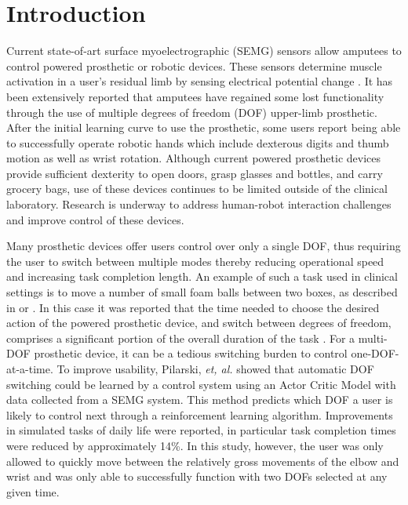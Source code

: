 \documentclass[twocolumn]{sagej}
\begin{document}

\maketitle

\section*{Introduction}

Current state-of-art surface myoelectrographic (SEMG) sensors allow amputees to control powered prosthetic or robotic devices.  These sensors determine muscle activation  in a user's residual limb by sensing electrical potential change \cite{Hargrove2007c}.  It has been extensively reported that amputees have regained some lost functionality through the use of  multiple degrees of freedom (DOF) upper-limb prosthetic\cite{Dalley02013}.  After the initial learning curve to use the prosthetic, some users report being able to successfully  operate robotic hands which include  dexterous digits and thumb motion as well as wrist rotation. Although current powered prosthetic devices provide sufficient dexterity to open doors, grasp  glasses  and bottles, and carry grocery  bags\cite{Belter2013}, use of these devices continues  to be limited outside  of the clinical laboratory.  Research is underway to address human-robot  interaction   challenges and improve control of these devices.\par \noindent
Many prosthetic  devices  offer users  control over only a single DOF, thus requiring the user to switch between multiple modes thereby reducing operational   speed  and increasing task completion length. An example of such a task used in clinical settings is to move  a number  of small foam balls between two boxes,  as described  in \cite{Dalley02013}\cite{Dawson2012} or \cite{Mathiowetz1985}.  In this case it was reported that  the time needed  to choose  the desired  action of the powered prosthetic device, and switch between degrees of freedom, comprises a significant  portion of the overall duration of the task \cite{Pilarski2012}.  For a multi-DOF  prosthetic device, it can be a tedious switching burden to control one-DOF-at-a-time. To improve usability, Pilarski, \textit{et, al.}\cite{Pilarski2012} showed that automatic DOF switching could be learned by a control  system using an Actor Critic Model with data collected from a SEMG system.  This method predicts which DOF a user is likely to control next through a reinforcement learning algorithm. Improvements in simulated tasks of daily life were reported, in particular task completion times were reduced by approximately 14\%\cite{Pilarski2012}.  In this study, however, the user was only allowed  to quickly move  between  the relatively gross movements  of the elbow and wrist and was only able to successfully function with two DOFs selected at any given time.  \par \noindent  
\end{document}

